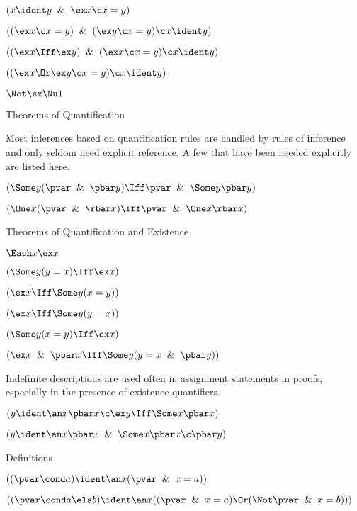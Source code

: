  $(x \ident y \And \ex x \c x =y)$

 $((\ex x \c x = y) \And (\ex y \c x = y) \c x \ident y)$

 $((\ex x \Iff \ex y) \And (\ex x \c x = y) \c x \ident y)$

 $((\ex x \Or \ex y \c x = y) \c x \ident y)$

 $ \Not \ex \Nul$

\lineb

\noindent{}Theorems of Quantification

Most inferences based on quantification rules are handled by rules of
inference and only seldom need explicit reference.  A few that have been
needed explicitly are listed here.

 $(\Some y (\pvar  \And \pbar y) \Iff \pvar \And \Some y \pbar y)$

 $(\One x(\pvar\And\rbar x)\Iff \pvar\And\One x\rbar x)$
\lineb

\noindent{}Theorems of Quantification and Existence

 $\Each x \ex x$

 $(\Some y (y = x) \Iff \ex x)$

 $(\ex x \Iff \Some y (x = y) )$

 $(\ex x \Iff \Some y (y = x))$ 

 $(\Some y (x = y) \Iff \ex x)$

 $(\ex x \And \pbar x \Iff \Some y(y = x \And \pbar y))$

\lineb


Indefinite descriptions are used often in assignment statements
in proofs, especially in the presence of existence quantifiers.
\lineb

 $(y \ident \an x \pbar x \c \ex y \Iff \Some x \pbar x )$

 $(y \ident \an x \pbar x \And \Some x \pbar x \c \pbar y)$
\lineb



\noindent{}Definitions

 $((\pvar \cond a )\ident \an x (\pvar \And x = a))$

 $((\pvar \cond a \els b)\ident \an x ((\pvar \And x = a)\Or (\Not\pvar \And x = b)))$
\lineb

